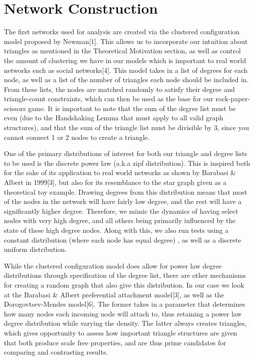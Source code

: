 \documentclass[letterpaper, 12 pt, conference]{ieeeconf}
\begin{document}
\section*{Network Construction}
The first networks used for analysis are created via the clustered configuration model proposed by Newman[1]. This allows us to incorporate our intuition about triangles as mentioned in the Theoretical Motivation section, as well as control the amount of clustering we have in our models which is important to real world networks such as social networks[4]. This model takes in a list of degrees for each node, as well as a list of the number of triangles each node should be included in. From these lists, the nodes are matched randomly to satisfy their degree and triangle-count constraints, which can then be used as the base for our rock-paper-scissors game. It is important to note that the sum of the degree list must be even (due to the Handshaking Lemma that must apply to all valid graph structures), and that the sum of the triangle list must be divisible by 3, since you cannot connect 1 or 2 nodes to create a triangle. 
\par
One of the primary distributions of interest for both our triangle and degree lists to be used is the discrete power law (a.k.a zipf distribution). This is inspired both for the sake of its application to real world networks as shown by Barabasi \& Albert in 1999[3], but also for its resemblance to the star graph given as a theoretical toy example. Drawing degrees from this distribution means that most of the nodes in the network will have fairly low degree, and the rest will have a significantly higher degree. Therefore, we mimic the dynamics of having select nodes with very high degree, and all others being primarily influenced by the state of these high degree nodes. Along with this, we also run tests using a constant distribution (where each node has equal degree) , as well as a discrete uniform distribution. 
\par 
While the clustered configuration model does allow for power law degree distributions through specification of the degree list, there are other mechanisms for creating a random graph that also give this distribution. In our case we look at the Barabasi \& Albert preferential attachment model[3], as well as the Dorogovtsev-Mendes model[6]. The former takes in a parameter that determines how many nodes each incoming node will attach to, thus retaining a power law degree distribution while varying the density. The latter always creates triangles, which gives opportunity to assess how important triangle structures are given that both produce scale free properties, and are thus prime candidates for comparing and contrasting results. 
\end{document}
